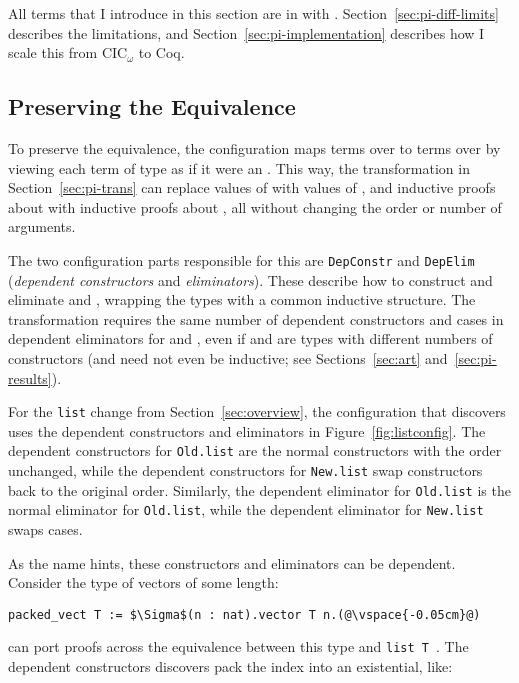 All terms that I introduce in this section are in  with . %
Section~\ref{sec:pi-diff-limits} describes the limitations, and Section~\ref{sec:pi-implementation} describes how I scale this from CIC$_{\omega}$ to Coq.

\subsection{Preserving the Equivalence}
\label{sec:pi-diff-equiv}

To preserve the equivalence, the configuration maps terms over \Aa to terms over \B by viewing each
term of type \B as if it were an \Aa.
This way, the transformation in Section~\ref{sec:pi-trans} can replace values of \Aa with values of \B, and
inductive proofs about \Aa with inductive proofs about \B, %
all without changing the order or number of arguments.

The two configuration parts responsible for this are \lstinline{DepConstr}
and \lstinline{DepElim} (\textit{dependent constructors} and \textit{eliminators}).
These describe how to construct and eliminate \Aa and \B, wrapping the types with a common inductive structure.
The transformation requires the same number of dependent constructors and cases in dependent eliminators for \Aa and \B,
even if \Aa and \B are types with different numbers of constructors
(\Aa and \B need not even be inductive; see Sections~\ref{sec:art} and~\ref{sec:pi-results}).

For the \lstinline{list} change from Section~\ref{sec:overview},
the configuration that \toolnamec discovers uses the dependent constructors
and eliminators in Figure~\ref{fig:listconfig}. The dependent constructors for \lstinline{Old.list}
are the normal constructors with the order unchanged,
while the dependent constructors for \lstinline{New.list} swap constructors
back to the original order.
Similarly, the dependent eliminator for \lstinline{Old.list} is the normal eliminator for \lstinline{Old.list},
while the dependent eliminator for \lstinline{New.list} swaps cases.

As the name hints, these constructors and eliminators can be dependent.
Consider the type of vectors of some length:

\begin{lstlisting}
packed_vect T := $\Sigma$(n : nat).vector T n.(@\vspace{-0.05cm}@)
\end{lstlisting}
\toolnamec can port proofs across the equivalence between this type and \lstinline{list T}~\href{https://github.com/uwplse/pumpkin-pi/blob/v2.0.0/plugin/coq/examples/Example.v}{}. %
The dependent constructors \toolnamec discovers pack the index into an existential, like:

